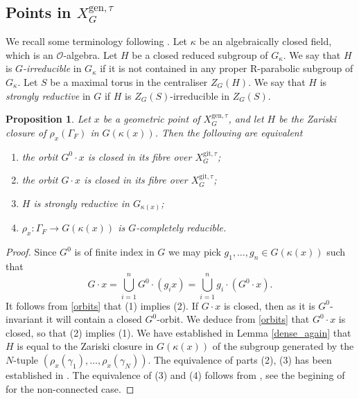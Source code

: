 \documentclass{amsart}
\newtheorem{prop}{Proposition}[section]
\theoremstyle{definition}
\theoremstyle{remark}
\newcommand{\OO}{\mathcal O}
\newcommand{\gen}{\mathrm{gen}}
\newcommand{\XgenGtau}{X^{\gen, \tau}_G}
\newcommand{\git}{\mathrm{git}}
\begin{document}
 




\subsection{\texorpdfstring{Points in $\XgenGtau$}{Points in XgenG}}\label{sec_points_in_XgenGtau}
We recall some terminology following \cite{martin}. Let $\kappa$ be an algebraically 
closed field, which is an $\OO$-algebra. Let $H$ be a closed reduced subgroup of $G_{\kappa}$. 
We say that $H$ is \emph{$G$-irreducible} in $G_{\kappa}$ if it is not contained in any proper
R-parabolic subgroup of $G_\kappa$. Let $S$ be a maximal torus in the centraliser $Z_G(H)$. 
We say that $H$ is \emph{strongly reductive} in $G$ if $H$ is $Z_G(S)$-irreducible in $Z_G(S)$.

\begin{prop}\label{closed_orbit} Let $x$ be a geometric point of $\XgenGtau$, 
and let $H$ be the Zariski closure of $\rho_x(\Gamma_F)$ in $G(\kappa(x))$. Then the following are equivalent
\begin{enumerate}
\item the orbit $G^0\cdot x$ is closed in its fibre over $X^{\git, \tau}_G$;
\item the orbit $G\cdot x$ is closed in its fibre over $X^{\git, \tau}_G$; 
\item $H$ is strongly reductive in $G_{\kappa(x)}$;
\item $\rho_x: \Gamma_F \rightarrow G(\kappa(x))$ is $G$-completely reducible.
\end{enumerate} 
\end{prop}
\begin{proof} Since $G^0$ is of finite index in $G$ we may pick $g_1, \ldots, g_n \in G(\kappa(x))$ such that 
\begin{equation}\label{orbits}
G\cdot x = \bigcup_{i=1}^n G^0\cdot (g_i x)= \bigcup_{i=1}^n g_i\cdot (G^0\cdot x).
\end{equation}
It follows from \eqref{orbits} that (1) implies (2).
 If $G\cdot x$ is closed, then as it is $G^0$-invariant
it will contain a closed $G^0$-orbit. We deduce from \eqref{orbits} that 
$G^0\cdot x$ is closed, so that (2) implies (1).
We have established in Lemma \ref{dense_again} that $H$ is equal to the 
Zariski closure in $G(\kappa(x))$ of the subgroup generated by the $N$-tuple
$(\rho_x(\gamma_1), \ldots, \rho_x(\gamma_N))$. The equivalence 
of parts (2), (3) has been established in \cite[Theorem 16.4]{Richardson1988ConjugacyCO}.
The equivalence of (3) and (4)  follows from \cite[Theorem 3.1]{BMR}, see the begining of
 \cite[Section 6.3]{BMR} for the non-connected case. 
\end{proof} 
\end{document}
